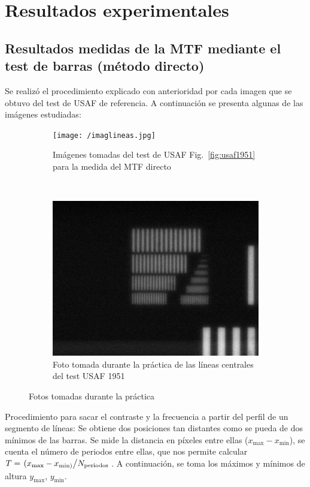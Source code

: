 \documentclass{./packages/optica-article}
\begin{document}
\section{Resultados experimentales}\label{sec:resultados}

\subsection{Resultados medidas de la MTF mediante el test de barras (método directo)}\label{sec:mtf-directo}
Se realizó el procedimiento explicado con anterioridad por cada imagen que se obtuvo del test de USAF de referencia. A continuación se presenta algunas de las imágenes estudiadas:

\begin{figure}
\centering
\begin{subfigure}[t]{0.576\textwidth}\centering
	\texttt{[image: /imaglineas.jpg]}
	\caption{Imágenes tomadas del test de USAF Fig.~\ref{fig:usaf1951} para la medida del MTF directo}\label{fig:images:example}
\end{subfigure}
\,
\begin{subfigure}[t]{0.4\textwidth}\centering
	\includegraphics[width=\textwidth]{smallest_lines}
	\caption{Foto tomada durante la práctica de las líneas centrales del test USAF 1951}\label{fig:usafpic}
\end{subfigure}
\caption{Fotos tomadas durante la práctica}\label{fig:group:usaf}
\end{figure}
Procedimiento para sacar el contraste y la frecuencia a partir del perfil de un segmento de líneas: Se obtiene dos posiciones tan distantes como se pueda de dos mínimos de las barras. Se mide la distancia en píxeles entre ellas ($x_{\max} - x_{\min} $), se cuenta el número de periodos entre ellas, que nos permite calcular $T = \flatfrac{(x_{\max} - x_{\min)} }{N_{\textrm{periodos}}}$. A continuación,  se toma los máximos y mínimos de altura $y_{\max}$, $y_{\min}$.
\end{document}
